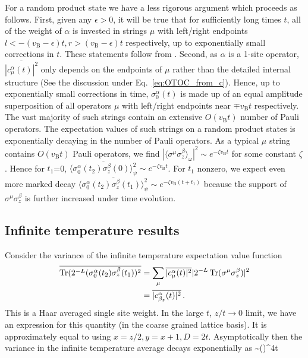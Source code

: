 \documentclass[aps,prb,twocolumn,superscriptaddress]{revtex4-1}
\begin{document}
For a random product state we have a less rigorous argument which proceeds as follows. First, given any $\epsilon>0$, it will be true that for sufficiently long times $t$, all of the weight of $\alpha$ is invested in strings $\mu$ with left/right endpoints $l < -(v_{\text{B}}-\epsilon)t, r>(v_{\text{B}}-\epsilon)t$ respectively, up to exponentially small corrections in $t$. These statements follow from . Second, as $\alpha$ is a 1-site operator, $ \overline{|c^{\alpha}_{\mu}(t)|^2}$ only depends on the endpoints of $\mu$ rather than the detailed internal structure (See the discussion under Eq.~\eqref{eq:OTOC_from_c}). Hence, up to exponentially small corrections in time, $\sigma_0^\alpha(t)$ is made up of an equal amplitude superposition of all operators $\mu$ with left/right endpoints near $\mp v_{\text{B}} t$ respectively. The vast majority of such strings contain an extensive $O(v_{\text{B}} t)$ number of Pauli operators. The  expectation values of such strings on a random product states is exponentially decaying in the number of Pauli operators. As a typical $\mu$ string contains $O(v_{\text{B}} t)$ Pauli operators, we find $ |\langle{\sigma^\mu\sigma_z^\beta}\rangle_\omega|^2 \sim e^{- \zeta v_{\text{B}} t }$ for some constant $\zeta$. Hence for $t_1$=0, $\overline{\langle{\sigma_0^\alpha(t_2) \sigma_z^\beta(0)}\rangle^2_\psi} \sim e^{-\zeta v_{\text{B}} t}$.  For $t_1$ nonzero, we expect even more marked decay $\overline{\langle{\sigma_0^\alpha(t_2) \sigma_z^\beta(t_1)}\rangle^2_\psi} \sim e^{-\zeta v_{\text{B}} (t+t_1)}$ because the support of $\sigma^\mu\sigma_z^\beta$ is further increased under time evolution.

\subsection{Infinite temperature results}\label{app:infinitetemperature}
Consider the variance of the infinite temperature expectation value function 
\begin{align}
\overline{\operatorname{Tr} (2^{-L}(\sigma_0^\alpha(t_2) \sigma_z^\beta(t_1))^2} &= \sum_{\mu} \overline{|c^{\alpha}_{\mu}(t)|^2}  |2^{-L} \operatorname{Tr} (\sigma^\mu\sigma_z^\beta) |^2\nonumber\\
&= \overline{|c^{\alpha}_{\beta_z}(t)|^2} \,.
\end{align}
This is a Haar averaged single site weight. In the large $t$,  $z/t\rightarrow 0$ limit, we have an expression for this quantity (in the coarse grained lattice basis). It is approximately equal to  using $x= z/2, y= x+1,D=2 t$. Asymptotically then the variance in the infinite temperature average decays exponentially as
\be
\sim \left(\right)^{4t}
\ee
\end{document}
